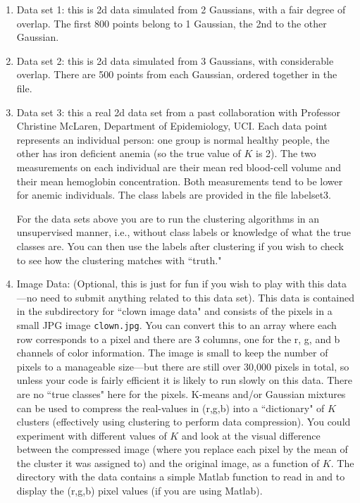 \documentclass[11pt]{article}
\begin{document}
\begin{enumerate}
\item Data set 1: this is 2d data simulated from 2 Gaussians, with
a fair degree of overlap. The first 800 points belong to 1 Gaussian,
the 2nd to the other Gaussian.

\item Data set 2: this is 2d data simulated from 3 Gaussians, with
considerable overlap. There are 500 points from each Gaussian,
ordered together in the file.

\item Data set 3: this a real 2d data set from a past collaboration with Professor
Christine McLaren, Department of Epidemiology, UCI. Each data point represents
an individual person: one group is normal healthy people, the other has iron
deficient anemia (so the true value of $K$ is 2). The two measurements on each
individual are their mean red blood-cell volume and their mean hemoglobin
concentration.  Both measurements tend to be lower for anemic individuals. The
class labels are provided in the file labelset3. 


For the data sets above you are to run the clustering
algorithms in an unsupervised manner, i.e., without class labels or knowledge of what the true classes are. 
You can then use the labels after clustering if you wish to check to see how the clustering
matches with ``truth."

\item Image Data: (Optional, this is just for fun if you wish to play with this data---no need to
submit anything related to this data set). This data is contained in the subdirectory for ``clown image data" and consists of the pixels in a small JPG image {\tt clown.jpg}. You can convert this to an array where each row corresponds to a pixel and there are 3 columns, one for the r, g, and b channels of color information. The image is small to keep the number of pixels to a manageable size---but there are still over 30,000 pixels in total, so unless your code is fairly efficient it is likely to run slowly on this data. There are no ``true classes" here for the pixels. K-means and/or Gaussian mixtures can be used to compress the real-values in (r,g,b) into a ``dictionary" of $K$ clusters (effectively using clustering to perform data compression). You could experiment with different values of $K$ and look at the visual difference between the compressed image (where you replace each pixel by the mean of the cluster it was assigned to) and the original image, as a function of $K$.  The  directory with the data contains a simple Matlab function to read in and  to display the (r,g,b) pixel values (if you are using Matlab). 

\end{enumerate}
     
\end{document}
